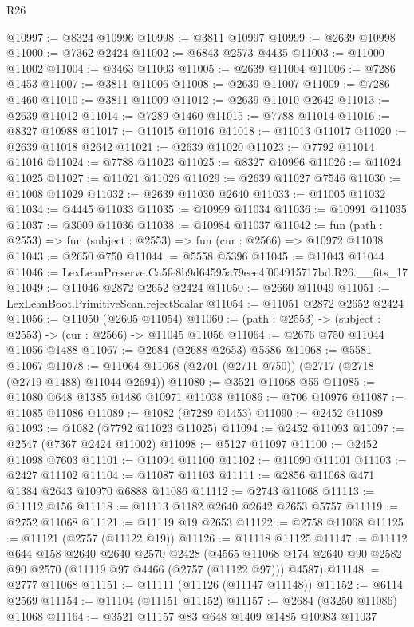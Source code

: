 \begin{lexlean}{R26}
\begin{coremodule}
@10997 := @8324 @10996
@10998 := @3811 @10997
@10999 := @2639 @10998
@11000 := @7362 @2424
@11002 := @6843 @2573 @4435
@11003 := @11000 @11002
@11004 := @3463 @11003
@11005 := @2639 @11004
@11006 := @7286 @1453
@11007 := @3811 @11006
@11008 := @2639 @11007
@11009 := @7286 @1460
@11010 := @3811 @11009
@11012 := @2639 @11010 @2642
@11013 := @2639 @11012
@11014 := @7289 @1460
@11015 := @7788 @11014
@11016 := @8327 @10988
@11017 := @11015 @11016
@11018 := @11013 @11017
@11020 := @2639 @11018 @2642
@11021 := @2639 @11020
@11023 := @7792 @11014 @11016
@11024 := @7788 @11023
@11025 := @8327 @10996
@11026 := @11024 @11025
@11027 := @11021 @11026
@11029 := @2639 @11027 @7546
@11030 := @11008 @11029
@11032 := @2639 @11030 @2640
@11033 := @11005 @11032
@11034 := @4445 @11033
@11035 := @10999 @11034
@11036 := @10991 @11035
@11037 := @3009 @11036
@11038 := @10984 @11037
@11042 := fun (path : @2553) => fun (subject : @2553) => fun (cur : @2566) => @10972 @11038
@11043 := @2650 @750
@11044 := @5558 @5396
@11045 := @11043 @11044
@11046 := LexLeanPreserve.Ca5fe8b9d64595a79eee4f004915717bd.R26.__fits_17
@11049 := @11046 @2872 @2652 @2424
@11050 := @2660 @11049
@11051 := LexLeanBoot.PrimitiveScan.rejectScalar
@11054 := @11051 @2872 @2652 @2424
@11056 := @11050 (@2605 @11054)
@11060 := (path : @2553) -> (subject : @2553) -> (cur : @2566) -> @11045 @11056
@11064 := @2676 @750 @11044 @11056 @1488
@11067 := @2684 (@2688 @2653) @5586
@11068 := @5581 @11067
@11078 := @11064 @11068 (@2701 (@2711 @750)) (@2717 (@2718 (@2719 @1488) @11044 @2694))
@11080 := @3521 @11068 @55
@11085 := @11080 @648 @1385 @1486 @10971 @11038
@11086 := @706 @10976
@11087 := @11085 @11086
@11089 := @1082 (@7289 @1453)
@11090 := @2452 @11089
@11093 := @1082 (@7792 @11023 @11025)
@11094 := @2452 @11093
@11097 := @2547 (@7367 @2424 @11002)
@11098 := @5127 @11097
@11100 := @2452 @11098 @7603
@11101 := @11094 @11100
@11102 := @11090 @11101
@11103 := @2427 @11102
@11104 := @11087 @11103
@11111 := @2856 @11068 @471 @1384 @2643 @10970 @6888 @11086
@11112 := @2743 @11068
@11113 := @11112 @156
@11118 := @11113 @1182 @2640 @2642 @2653 @5757
@11119 := @2752 @11068
@11121 := @11119 @19 @2653
@11122 := @2758 @11068
@11125 := @11121 (@2757 (@11122 @19))
@11126 := @11118 @11125
@11147 := @11112
    @644
    @158
    @2640
    @2640
    @2570
    @2428
    (@4565 @11068 @174 @2640 @90 @2582 @90 @2570 (@11119 @97 @4466 (@2757 (@11122 @97))) @4587)
@11148 := @2777 @11068
@11151 := @11111 (@11126 (@11147 @11148))
@11152 := @6114 @2569
@11154 := @11104 (@11151 @11152)
@11157 := @2684 (@3250 @11086) @11068
@11164 := @3521 @11157 @83 @648 @1409 @1485 @10983 @11037

\end{coremodule}
\end{lexlean}
